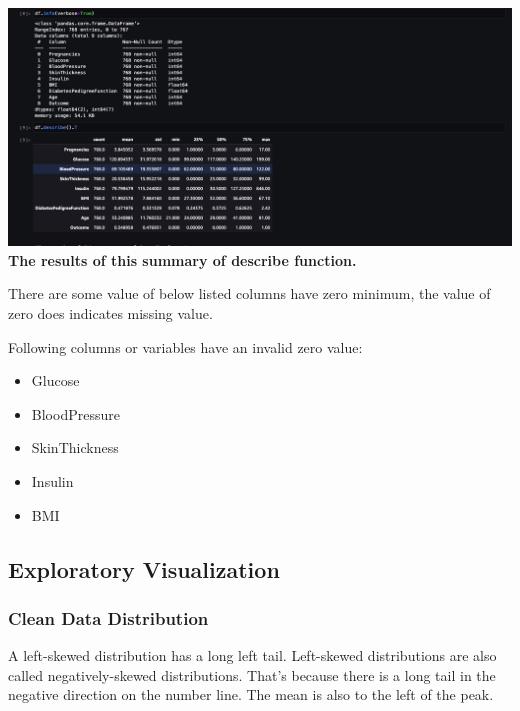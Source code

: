 \documentclass[
]{article}
\providecommand{\tightlist}{%
  \setlength{\itemsep}{0pt}\setlength{\parskip}{0pt}}
\begin{document}
\includegraphics{describe.png} \textbf{The results of this summary of
describe function.}

There are some value of below listed columns have zero minimum, the
value of zero does indicates missing value.

Following columns or variables have an invalid zero value:

\begin{itemize}
\tightlist
\item
  Glucose
\item
  BloodPressure
\item
  SkinThickness
\item
  Insulin
\item
  BMI
\end{itemize}

\hypertarget{exploratory-visualization}{%
\subsection{Exploratory Visualization}\label{exploratory-visualization}}

\hypertarget{clean-data-distribution}{%
\subsubsection{Clean Data Distribution}\label{clean-data-distribution}}

A left-skewed distribution has a long left tail. Left-skewed
distributions are also called negatively-skewed distributions. That's
because there is a long tail in the negative direction on the number
line. The mean is also to the left of the peak.
\end{document}
